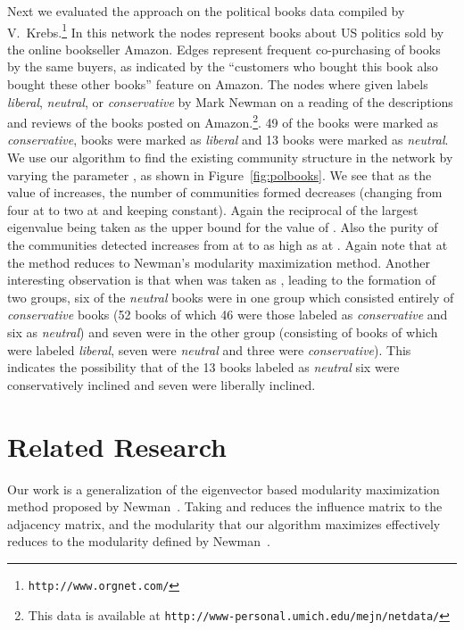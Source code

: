 \documentclass{sig-alternate}
\newcommand{\figref}[1]{Figure~\ref{#1}}
\begin{document}
Next we evaluated the approach on the political books data compiled by V.~Krebs.\footnote{\texttt{http://www.orgnet.com/}} In this network the nodes represent books about US politics sold by the online bookseller Amazon. Edges represent frequent co-purchasing of books by the same buyers, as indicated by the ``customers who bought this book also bought these other books'' feature on Amazon. The nodes where given labels \emph{liberal}, \emph{neutral}, or \emph{conservative} by Mark Newman on a reading of the descriptions and reviews of the books posted on Amazon.\footnote{This data is available at \texttt{http://www-personal.umich.edu/mejn/netdata/}}. 49 of the books were marked as \emph{conservative},  books were marked as \emph{liberal} and 13 books were marked as \emph{neutral}. We use our algorithm to find the existing community structure in the network by varying the parameter , as shown in \figref{fig:polbooks}.
We see that as the value of  increases, the number of communities formed decreases (changing from four at  to two at  and keeping  constant). Again the reciprocal of the largest eigenvalue being taken as the upper bound for the value of . Also the purity of the communities detected increases from  at  to as high as  at . Again note that at  the method reduces to Newman's modularity maximization method. Another interesting observation is that  when   was taken as , leading to the formation of two groups, six of the \emph{neutral} books were  in one group which consisted entirely of \emph{conservative} books (52 books of which 46 were those labeled as  \emph{conservative} and six as \emph{neutral}) and seven were  in the other group (consisting of  books  of  which  were labeled \emph{liberal}, seven were \emph{neutral} and  three were \emph{conservative}). This indicates the possibility that of the 13 books labeled as \emph{neutral}  six  were conservatively inclined and seven were liberally inclined.


\section{Related Research}
\label{sec:related}
Our work is a generalization of the  eigenvector based modularity maximization method proposed by Newman~\cite{Newman206}. Taking  and  reduces the influence matrix to the adjacency matrix, and the modularity that our algorithm maximizes effectively reduces to the modularity defined by Newman~\cite{Newman206}.
\end{document}
